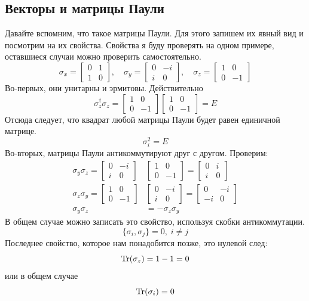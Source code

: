 \subsection{Векторы и матрицы Паули}
Давайте вспомним, что такое матрицы Паули. Для этого запишем их явный вид и посмотрим на их свойства. Свойства я буду проверять на одном примере, оставшиеся случаи можно проверить самостоятельно.
\[
\sigma_x = \begin{bmatrix} 0 & 1 \\ 1 & 0 \end{bmatrix}, \quad \sigma_y = \begin{bmatrix} 0 & -i \\ i & 0 \end{bmatrix}, \quad \sigma_z = \begin{bmatrix} 1 & 0 \\ 0 & -1 \end{bmatrix}
\]
Во-первых, они унитарны и эрмитовы. Действительно
\[
\sigma_z^{\dagger}\sigma_z = \begin{bmatrix} 1 & 0 \\ 0 & -1 \end{bmatrix}\begin{bmatrix} 1 & 0 \\ 0 & -1 \end{bmatrix} = E
\]
Отсюда следует, что квадрат любой матрицы Паули будет равен единичной матрице.
\[
\sigma_i^2 = E
\]
Во-вторых, матрицы Паули антикоммутируют друг с другом. Проверим:
\begin{align*}
    \sigma_y\sigma_z = \begin{bmatrix} 0 & -i \\ i & 0 \end{bmatrix}&\begin{bmatrix} 1 & 0 \\ 0 & -1 \end{bmatrix} = \begin{bmatrix} 0 & i \\ i & 0 \end{bmatrix}\\
    \sigma_z\sigma_y = \begin{bmatrix} 1 & 0 \\ 0 & -1 \end{bmatrix}&\begin{bmatrix} 0 & -i \\ i & 0 \end{bmatrix} = \begin{bmatrix} 0 & -i \\ -i & 0 \end{bmatrix}\\
    \sigma_y\sigma_z &= -\sigma_z\sigma_y
\end{align*}
В общем случае можно записать это свойство, используя скобки антикоммутации.
\[
\{\sigma_i,\sigma_j\} = 0, \; i\neq j
\]
Последнее свойство, которое нам понадобится позже, это нулевой след:
\[
\Tr(\sigma_z) = 1 - 1 = 0
\]
или в общем случае
\[
\Tr(\sigma_i) = 0
\]

